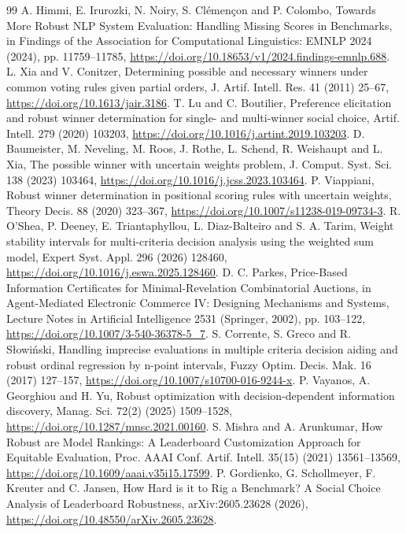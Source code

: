 \documentclass[preprint,11pt]{elsarticle}
\begin{document}
\begin{thebibliography}{99}
 A. Himmi, E. Irurozki, N. Noiry, S. Cl\'emen\c{c}on and P. Colombo, Towards More Robust NLP System Evaluation: Handling Missing Scores in Benchmarks, in Findings of the Association for Computational Linguistics: EMNLP 2024 (2024), pp. 11759--11785, \url{https://doi.org/10.18653/v1/2024.findings-emnlp.688}.
 L. Xia and V. Conitzer, Determining possible and necessary winners under common voting rules given partial orders, J. Artif. Intell. Res. 41 (2011) 25--67, \url{https://doi.org/10.1613/jair.3186}.
 T. Lu and C. Boutilier, Preference elicitation and robust winner determination for single- and multi-winner social choice, Artif. Intell. 279 (2020) 103203, \url{https://doi.org/10.1016/j.artint.2019.103203}.
 D. Baumeister, M. Neveling, M. Roos, J. Rothe, L. Schend, R. Weishaupt and L. Xia, The possible winner with uncertain weights problem, J. Comput. Syst. Sci. 138 (2023) 103464, \url{https://doi.org/10.1016/j.jcss.2023.103464}.
 P. Viappiani, Robust winner determination in positional scoring rules with uncertain weights, Theory Decis. 88 (2020) 323--367, \url{https://doi.org/10.1007/s11238-019-09734-3}.
 R. O'Shea, P. Deeney, E. Triantaphyllou, L. Diaz-Balteiro and S. A. Tarim, Weight stability intervals for multi-criteria decision analysis using the weighted sum model, Expert Syst. Appl. 296 (2026) 128460, \url{https://doi.org/10.1016/j.eswa.2025.128460}.
 D. C. Parkes, Price-Based Information Certificates for Minimal-Revelation Combinatorial Auctions, in Agent-Mediated Electronic Commerce IV: Designing Mechanisms and Systems, Lecture Notes in Artificial Intelligence 2531 (Springer, 2002), pp. 103--122, \url{https://doi.org/10.1007/3-540-36378-5_7}.
 S. Corrente, S. Greco and R. S\l{}owi\'nski, Handling imprecise evaluations in multiple criteria decision aiding and robust ordinal regression by n-point intervals, Fuzzy Optim. Decis. Mak. 16 (2017) 127--157, \url{https://doi.org/10.1007/s10700-016-9244-x}.
 P. Vayanos, A. Georghiou and H. Yu, Robust optimization with decision-dependent information discovery, Manag. Sci. 72(2) (2025) 1509--1528, \url{https://doi.org/10.1287/mnsc.2021.00160}.
 S. Mishra and A. Arunkumar, How Robust are Model Rankings: A Leaderboard Customization Approach for Equitable Evaluation, Proc. AAAI Conf. Artif. Intell. 35(15) (2021) 13561--13569, \url{https://doi.org/10.1609/aaai.v35i15.17599}.
 P. Gordienko, G. Schollmeyer, F. Kreuter and C. Jansen, How Hard is it to Rig a Benchmark? A Social Choice Analysis of Leaderboard Robustness, arXiv:2605.23628 (2026), \url{https://doi.org/10.48550/arXiv.2605.23628}.

\end{thebibliography}
\end{document}
